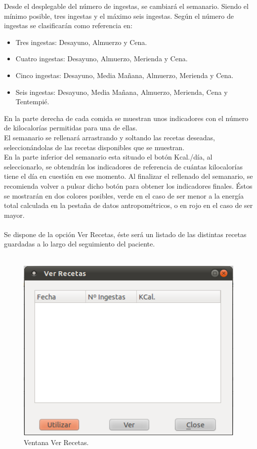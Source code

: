 Desde el desplegable del número de ingestas, se cambiará el semanario. Siendo el mínimo posible, tres ingestas y el máximo seis ingestas. Según el número de ingestas se clasificarán como referencia en:
\begin{itemize}
\item Tres ingestas: Desayuno, Almuerzo y Cena.
\item Cuatro ingestas: Desayuno, Almuerzo, Merienda y Cena.
\item Cinco ingestas: Desayuno, Media Mañana, Almuerzo, Merienda y Cena.
\item Seis ingestas: Desayuno, Media Mañana, Almuerzo, Merienda, Cena y Tentempié.
\end{itemize}
En la parte derecha de cada comida se muestran unos indicadores con el número de kilocalorías permitidas para una de ellas.\\
El semanario se rellenará arrastrando y soltando las recetas deseadas, seleccionándolas de las recetas disponibles que se muestran.\\
En la parte inferior del semanario esta situado el botón Kcal./día, al seleccionarlo, se obtendrán los indicadores de referencia de cuántas kilocalorías tiene el día en cuestión en ese momento. Al finalizar el rellenado del semanario, se recomienda volver a pulsar dicho botón para obtener los indicadores finales. Éstos se mostrarán en dos colores posibles, verde en el caso de ser menor a la energía total calculada en la pestaña de datos antropométricos, o en rojo en el caso de ser mayor.\\\\
Se dispone de la opción Ver Recetas, éste será un listado de las distintas recetas guardadas a lo largo del seguimiento del paciente.\\\\
\begin{figure}[H]
  \label{cuestfrec}
  \begin{center}
    \includegraphics[scale=0.5]{../../Image/verrecetas.png}
  \end{center}
  \caption{Ventana Ver Recetas.}
\end{figure}

